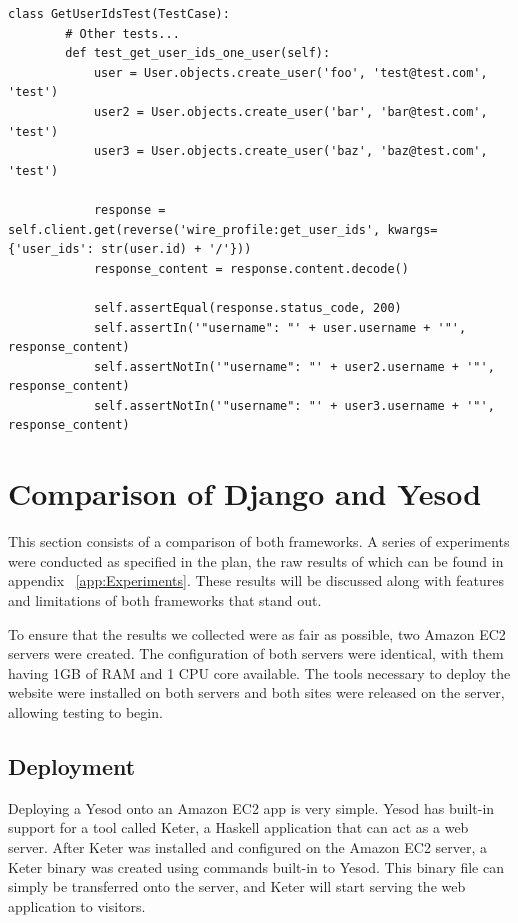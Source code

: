 \begin{lstlisting}[caption={Django checking a JSON response test},label={code:djangoCheckJsonResponse}]
	class GetUserIdsTest(TestCase):
		# Other tests...
		def test_get_user_ids_one_user(self):
			user = User.objects.create_user('foo', 'test@test.com', 'test')
			user2 = User.objects.create_user('bar', 'bar@test.com', 'test')
			user3 = User.objects.create_user('baz', 'baz@test.com', 'test')

			response = self.client.get(reverse('wire_profile:get_user_ids', kwargs={'user_ids': str(user.id) + '/'}))
			response_content = response.content.decode()

			self.assertEqual(response.status_code, 200)
			self.assertIn('"username": "' + user.username + '"', response_content)
			self.assertNotIn('"username": "' + user2.username + '"', response_content)
			self.assertNotIn('"username": "' + user3.username + '"', response_content)
\end{lstlisting}

\section{Comparison of Django and Yesod}

This section consists of a comparison of both frameworks. A series of experiments
were conducted as specified in the plan, the raw results of which can be found
in appendix ~\ref{app:Experiments}. These results will be discussed along with
features and limitations of both frameworks that stand out.

To ensure that the results we collected were as fair as possible, two Amazon
EC2 servers were created. The configuration of both servers were identical,
with them having 1GB of RAM and 1 CPU core available. The tools necessary
to deploy the website were installed on both servers and both sites were
released on the server, allowing testing to begin.

\subsection{Deployment}

Deploying a Yesod onto an Amazon EC2 app is very simple. Yesod has built-in
support for a tool called Keter, a Haskell application that can act as a
web server. After Keter was installed and configured on the Amazon EC2 server,
a Keter binary was created using commands built-in to Yesod. This binary
file can simply be transferred onto the server, and Keter will start serving
the web application to visitors. \parencite[Deploying your Webapp]{yesodBook}

